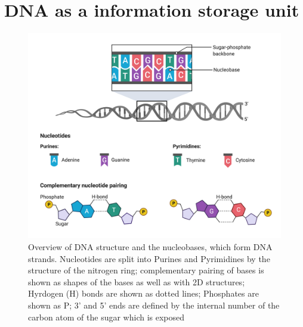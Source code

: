 \section[DNA]{DNA as a information storage unit}
\label{intro-sec:DNA}

\begin{figure}[!ht]
\centering
\includegraphics[width=0.9\linewidth]{Figures/DNAStructure.png}
\caption[Overview DNA structure]{Overview of DNA structure and the nucleobases, which form DNA strands. Nucleotides are split into Purines and Pyrimidines by the structure of the nitrogen ring; complementary pairing of bases is shown as shapes of the bases as well as with 2D structures; Hyrdogen (H) bonds are shown as dotted lines; Phosphates are shown as P; 3' and 5' ends are defined by the internal number of the carbon atom of the sugar which is exposed}\label{fig:DNAstructure}
\end{figure}


